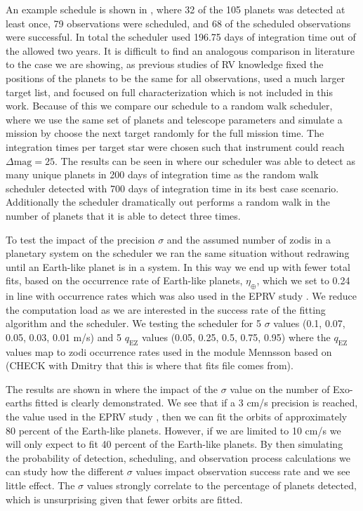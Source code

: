 An example schedule is shown in , where 32 of the 105
planets was detected at least once, 79 observations were scheduled, and 68 of
the scheduled observations were successful. In total the scheduler used 196.75
days of integration time out of the allowed two years. It is difficult to find
an analogous comparison in literature to the case we are showing, as previous
studies of RV knowledge fixed the positions of the planets to be the same for
all observations, used a much larger target list, and focused on full
characterization which is not included in this
work\citep{morganExplorationExpectedNumber2022a}. Because of this we compare
our schedule to a random walk scheduler, where we use the same set of planets
and telescope parameters and simulate a mission by choose the next target
randomly for the full mission time. The integration times per target star were
chosen such that instrument could reach $\Delta\textrm{mag}=25$. The results
can be seen in  where our scheduler was able to detect
as many unique planets in 200 days of integration time as the random walk
scheduler detected with 700 days of integration time in its best case scenario.
Additionally the scheduler dramatically out performs a random walk in the
number of planets that it is able to detect three times.

To test the impact of the precision $\sigma$ and the assumed number of zodis in
a planetary system on the scheduler we ran the same situation without redrawing
until an Earth-like planet is in a system. In this way we end up with fewer
total fits, based on the occurrence rate of Earth-like planets,
$\eta_{\oplus}$, which we set to 0.24 in line with
\citep{dulzJointRadialVelocity2020} occurrence rates which was also used in the
EPRV study \citet{morganExplorationExpectedNumber2022a}. We reduce the
computation load as we are interested in the success rate of the fitting
algorithm and the scheduler. We testing the scheduler for 5 $\sigma$ values
(0.1, 0.07, 0.05, 0.03, 0.01 m/s) and 5 $q_\textrm{EZ}$ values (0.05, 0.25,
0.5, 0.75, 0.95) where the $q_\textrm{EZ}$ values map to zodi occurrence rates
used in the  module {Mennsson} based on
\citet{mennessonCONSTRAININGEXOZODIACAL2014} (CHECK with Dmitry that this is where
that fits file comes from). 

The results are shown in  where the impact of
the $\sigma$ value on the number of Exo-earths fitted is clearly demonstrated.
We see that if a 3 cm/s precision is reached, the value used in the EPRV study
\citet{morganExplorationExpectedNumber2022a}, then we can fit the orbits of
approximately 80 percent of the Earth-like planets. However, if we are limited
to 10 cm/s we will only expect to fit 40 percent of the Earth-like planets. By
then simulating the probability of detection, scheduling, and observation
process calculations we can study how the different $\sigma$ values impact
observation success rate and we see little effect. The $\sigma$
values strongly correlate to the percentage of planets detected, which is unsurprising
given that fewer orbits are fitted.

